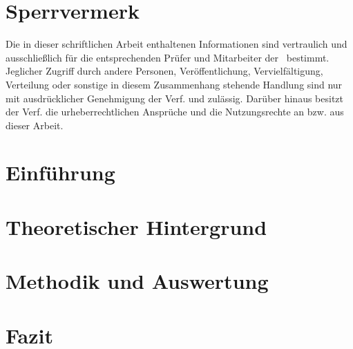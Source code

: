 \documentclass[a4paper, 11pt, german]{article}
\def\True{1}
\begin{document}
\clearpage

\if\Acronyms\True
	\section*{\acrotitle}
	
	\clearpage
\fi

\tableofcontents
\clearpage

\listoffigures
\clearpage


\if\Sperrvermerk \True
 \section*{Sperrvermerk}
 Die in dieser schriftlichen Arbeit enthaltenen Informationen sind vertraulich und ausschließlich
 für die entsprechenden Prüfer und Mitarbeiter der \Hochschulname~bestimmt.
Jeglicher Zugriff durch andere Personen, Veröffentlichung, Vervielfältigung,
Verteilung oder sonstige in diesem Zusammenhang stehende Handlung sind nur mit ausdrücklicher
Genehmigung der Verf. und \Firma\space zulässig. Darüber hinaus besitzt der
Verf. die urheberrecht\-lichen Ansprüche und \Firma\space die Nutzungsrechte
an bzw. aus dieser Arbeit.
\clearpage
\fi




\section{Einführung}

\clearpage
\section{Theoretischer Hintergrund}



\clearpage
\section{Methodik und Auswertung}


\clearpage
\section{Fazit}

\end{document}
